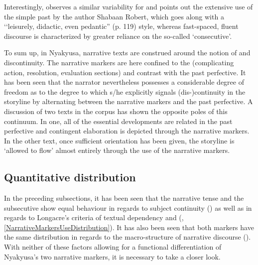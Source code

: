 Interestingly, \citet[118--120]{ContiniMoravaE1989} observes a similar variability for  and points out the extensive use of the simple past by the author Shabaan Robert, which goes along with a \lq\lq leisurely, didactic, even pedantic'' (p. 119) style, whereas fast-spaced, fluent discourse is characterized by greater reliance on the so-called \lq consecutive'.

To sum up, in Nyakyusa, narrative texts are construed around the notion of  and discontinuity. The narrative markers are here confined to the  (complicating action, resolution, evaluation sections) and contrast with the past perfective. It has been seen that the narrator nevertheless possesses a considerable degree of freedom as to the degree to which s/he explicitly signals (dis-)continuity in the storyline by alternating between the narrative markers and the past perfective. A discussion of two texts in the corpus has shown the opposite poles of this continuum. In one, all of the essential developments are related in the past perfective and contingent elaboration is depicted through the narrative markers. In the other text, once sufficient orientation has been given, the storyline is \lq allowed to flow' almost entirely through the use of the narrative markers.


\subsection{Quantitative distribution}\label{NarrativeMarkersQuantitativeDistribution}
In the preceding subsections, it has been seen that the narrative tense and the subsecutive show equal behaviour in regards to subject continuity () as well as in regards to Longacre's criteria of textual dependency and  (, \ref{NarrativeMarkersUseDistribution}). It has also been seen that both markers have the same distribution in regards to the macro-structure of narrative discourse (). With neither of these factors allowing for a functional differentiation of Nyakyusa's two narrative markers, it is necessary to take a closer look.

